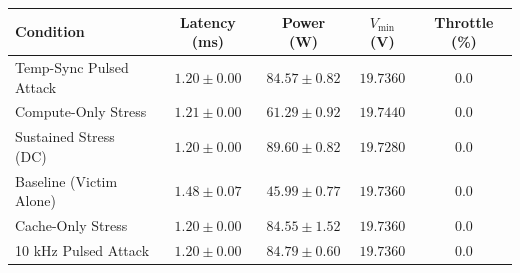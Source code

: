 \begin{tabular}{lcccc}
\toprule
Condition & Latency (ms) & Power (W) & $V_{\min}$ (V) & Throttle (\%) \\
\midrule
Temp-Sync Pulsed Attack & $1.20 \pm 0.00$ & $84.57 \pm 0.82$ & $19.7360$ & $0.0$ \\
Compute-Only Stress & $1.21 \pm 0.00$ & $61.29 \pm 0.92$ & $19.7440$ & $0.0$ \\
Sustained Stress (DC) & $1.20 \pm 0.00$ & $89.60 \pm 0.82$ & $19.7280$ & $0.0$ \\
Baseline (Victim Alone) & $1.48 \pm 0.07$ & $45.99 \pm 0.77$ & $19.7360$ & $0.0$ \\
Cache-Only Stress & $1.20 \pm 0.00$ & $84.55 \pm 1.52$ & $19.7360$ & $0.0$ \\
10 kHz Pulsed Attack & $1.20 \pm 0.00$ & $84.79 \pm 0.60$ & $19.7360$ & $0.0$ \\
\bottomrule
\end{tabular}
